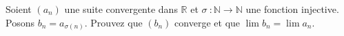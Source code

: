 
\begin{exercice}\label{exo0016}

Soient $\left(a_n\right)$ une suite convergente dans $\mathbb{R}$ et $\sigma~:\mathbb{N}\rightarrow\mathbb{N}$ une fonction injective. Posons $b_n=a_{\sigma(n)}$.  Prouvez que $\left(b_n\right)$ converge et que $\lim b_n=\lim a_n$.

\end{exercice}
